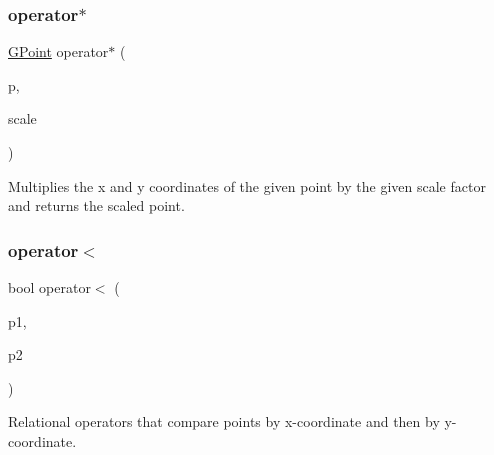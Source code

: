 \mbox{\label{structsgl_1_1GPoint_a8646a3383f5abfedad724d1e5e6040ef}} 
\subsubsection{\texorpdfstring{operator$\ast$}{operator*}}
{\footnotesize\ttfamily \mbox{\hyperlink{structsgl_1_1GPoint}{G\+Point}} operator$\ast$ (\begin{DoxyParamCaption}\item[{const \mbox{\hyperlink{structsgl_1_1GPoint}{G\+Point}} \&}]{p,  }\item[{double}]{scale }\end{DoxyParamCaption})\hspace{0.3cm}{\ttfamily [friend]}}



Multiplies the x and y coordinates of the given point by the given scale factor and returns the scaled point. 

\mbox{\label{structsgl_1_1GPoint_a8ef7ca0053558918c5f7bcae257c1bec}} 
\subsubsection{\texorpdfstring{operator$<$}{operator<}}
{\footnotesize\ttfamily bool operator$<$ (\begin{DoxyParamCaption}\item[{const \mbox{\hyperlink{structsgl_1_1GPoint}{G\+Point}} \&}]{p1,  }\item[{const \mbox{\hyperlink{structsgl_1_1GPoint}{G\+Point}} \&}]{p2 }\end{DoxyParamCaption})\hspace{0.3cm}{\ttfamily [friend]}}



Relational operators that compare points by x-\/coordinate and then by y-\/coordinate. 

\mbox{\label{structsgl_1_1GPoint_aa8890c3cbec1c39bac51117875950b01}} 
